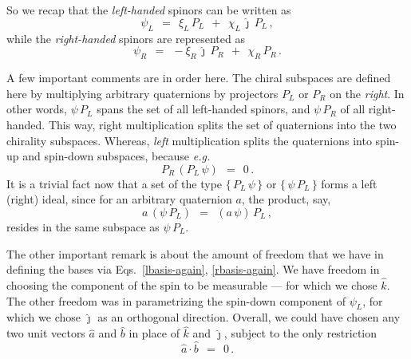 \documentclass[epsfig,12pt]{article}
\newcommand{\jj}{\hat\jmath}
\newcommand{\kk}{\hat k}
\begin{document}
	So we recap that the \emph{left-handed} spinors can be written as
\begin{equation}
\label{lbasis-again}
	\psi_L	~~=~~	\xi_L\,P_L  ~~+~~  \chi_L\,\jj\,P_L\,,
\end{equation}
	while the \emph{right-handed} spinors are represented as
\begin{equation}
\label{rbasis-again}
	\psi_R	~~=~~	-\xi_R\,\jj\,P_R  ~~+~~  \chi_R\,P_R\,.
\end{equation}

	A few important comments are in order here.
	The chiral subspaces are defined here by multiplying
	arbitrary quaternions by projectors $ P_L $ or $ P_R $ on the \emph{right}.
	In other words, $ \psi\, P_L $ spans the set of all left-handed spinors,
	and $ \psi\, P_R $ of all right-handed.
	This way, right multiplication splits the set of quaternions into
	the two chirality subspaces.
	Whereas, \emph{left} multiplication splits the quaternions into
	spin-up and spin-down subspaces, because \emph{e.g.}
\[
	P_R\, (P_L\, \psi)	~~=~~	0\,.
\]
	It is a trivial fact now that a set of the type $ \big\{\, P_L\, \psi \,\} $ or $ \big\{\, \psi\, P_L \,\} $
	forms a left (right) ideal, since for an arbitrary quaternion $ a $,
	the product, say,
\[
	a\, (\psi\, P_L)	~~=~~	(a\, \psi)\, P_L\,,
\]
	resides in the same subspace as $ \psi\, P_L $.

	The other important remark is about the amount of freedom that we have in defining
	the bases via Eqs.~\eqref{lbasis-again}, \eqref{rbasis-again}.
	We have freedom in choosing the component of the spin to be measurable --- for which we chose $ \kk $.
	The other freedom was in parametrizing the spin-down component of $ \psi_L $,
	for which we chose $ \jj $ as an orthogonal direction.
	Overall, we could have chosen any two unit vectors $ \hat a $ and $ \hat b $ in place of $ \kk $
	and $ \jj $, subject to the only restriction
\[
	\hat a \cdot \hat b	~~=~~	0\,.
\]
\end{document}
